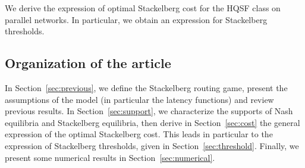 We derive the expression of optimal Stackelberg cost for the HQSF class on parallel networks. In particular, we obtain an expression for Stackelberg thresholds.


\subsection{Organization of the article}

In Section~\ref{sec:previous}, we define the Stackelberg routing game, present the assumptions of the model (in particular the latency functions) and review previous results. In Section~\ref{sec:support}, we characterize the supports of Nash equilibria and Stackelberg equilibria, then derive in Section~\ref{sec:cost} the general expression of the optimal Stackelberg cost. This leads in particular to the expression of Stackelberg thresholds, given in Section~\ref{sec:threshold}. Finally, we present some numerical results in Section~\ref{sec:numerical}.


